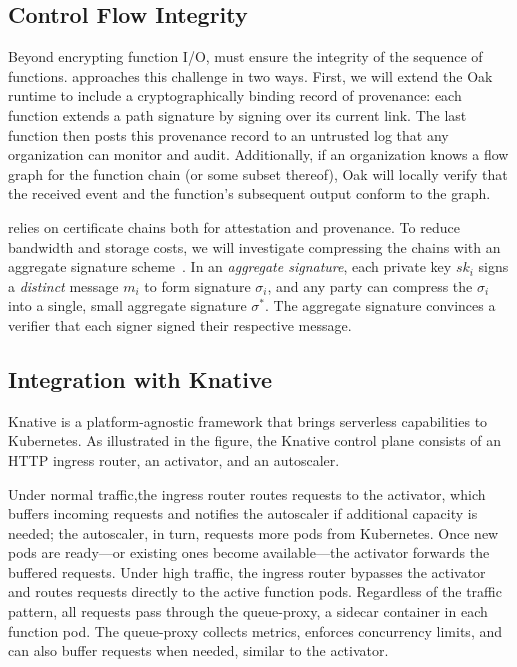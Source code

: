 


\subsection{Control Flow Integrity}
%
Beyond encrypting function I/O, \SystemName must ensure the integrity
of the sequence of functions.
%
\SystemName approaches this challenge in two ways.
%
First, we will extend the Oak runtime to include a cryptographically binding record
of provenance: each function extends a path signature by signing over its
current link.
%
The last function then posts this provenance record to an untrusted log that
any organization can monitor and audit.
%
Additionally, if an organization knows a flow graph for the function chain (or
some subset thereof),  Oak will locally verify that the received event and the
function's subsequent output conform to the graph.


\SystemName relies on certificate chains both for attestation and provenance.
%
To reduce bandwidth and storage costs, we will investigate compressing the chains
with an aggregate signature
scheme~\cite{03-eurocrypt-aggregate_signatures_bilinear_maps}.
%
In an \emph{aggregate signature}, each private key $sk_i$ signs a
\emph{distinct} message $m_i$ to form signature $\sigma_i$, and any party can
compress the $\sigma_i$ into a single, small aggregate signature $\sigma^*$.  
%
The aggregate signature convinces a verifier that each signer signed their
respective message.



\subsection{Integration with Knative}

%
%
Knative is a platform-agnostic framework that brings serverless capabilities to
Kubernetes.
%
As illustrated in the figure, the Knative control plane consists
of an HTTP ingress router, an activator, and an autoscaler.


Under normal traffic,the ingress router routes requests to the activator, which
buffers incoming requests and notifies the autoscaler if additional capacity is
needed; the autoscaler, in turn, requests more pods from Kubernetes.
%
Once new pods are ready---or existing ones become available---the activator
forwards the buffered requests.
%
Under high traffic, the ingress router bypasses the activator and routes
requests directly to the active function pods.
%
Regardless of the traffic pattern, all requests pass through the queue-proxy, a
sidecar container in each function pod.
%
The queue-proxy collects metrics, enforces concurrency limits, and can also
buffer requests when needed, similar to the activator.



